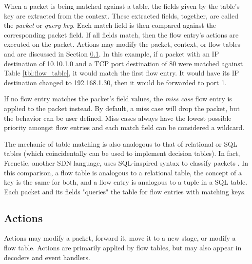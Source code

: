 When a packet is being matched
against a table, the fields given by the table's key are extracted from the
context. These extracted fields, together, are called the \emph{packet} or \emph{query key}.
Each match field is then compared against the corresponding packet field.
If all fields match, then the flow entry's actions are executed on the packet.
Actions may modify the packet, context, or flow tables and are discussed in Section
\ref{action_desc}.
In this example, if a packet with an IP destination of 10.10.1.0 and a TCP port
destination of 80 were matched against Table \ref{tbl:flow_table}, it would
match the first flow entry. It would have its IP destination changed to
192.168.1.30, then it would be forwarded to port 1.

If no flow entry matches the packet's field values, the \emph{miss case} flow
entry is applied to the packet instead. By default, a miss case will drop the
packet, but the behavior can be user defined. Miss cases always have the lowest
possible priority amongst flow entries and each match field can be considered a
wildcard.

The mechanic of table matching is also analogous to that of relational or SQL
tables (which coincidentally can be used to implement decision tables). In fact,
Frenetic, another SDN language, uses SQL-inspired syntax to
classify packets \cite{foster2011frenetic, foster2013frenetic}. In this comparison, a flow table is analogous to a relational table, the concept of a
key is the same for both, and a flow entry is analogous to a tuple in a SQL
table. Each packet and its fields "queries" the table for flow entries with
matching keys.

\subsection{Actions} \label{action_desc}

Actions may modify a packet, forward it, move it to a new stage, or modify a
flow table. 
Actions are primarily applied by flow tables, but may also appear in decoders
and event handlers.

